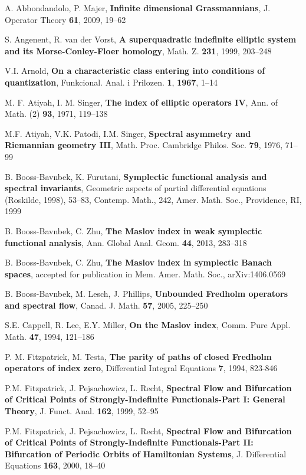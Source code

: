 \documentclass[a4paper,10pt]{article}
\begin{document}
 A. Abbondandolo, P. Majer, \textbf{Infinite dimensional Grassmannians}, J. Operator Theory \textbf{61}, 2009, 19--62

 S. Angenent, R. van der Vorst, \textbf{A superquadratic indefinite elliptic system and its Morse-Conley-Floer homology}, Math. Z. \textbf{231}, 1999, 203--248

 V.I. Arnold, \textbf{On a characteristic class entering into conditions of quantization},
 Funkcional. Anal. i Prilozen. \textbf{1}, \textbf{1967}, 1--14

 M. F. Atiyah, I. M.  Singer, \textbf{The index of elliptic operators IV}, Ann. of Math. (2) \textbf{93}, 1971, 119--138

 M.F. Atiyah, V.K.  Patodi, I.M.  Singer, \textbf{Spectral asymmetry and Riemannian geometry III},
 Math. Proc. Cambridge Philos. Soc.  \textbf{79}, 1976, 71--99

 B. Booss-Bavnbek, K. Furutani, \textbf{Symplectic functional analysis and spectral invariants}, Geometric aspects of partial differential equations (Roskilde, 1998), 53--83, Contemp. Math., 242, Amer. Math. Soc., Providence, RI,  1999

 B. Booss-Bavnbek, C. Zhu, \textbf{The Maslov index in weak symplectic functional analysis},  Ann. Global Anal. Geom. \textbf{44}, 2013, 283--318

 B. Booss-Bavnbek, C. Zhu, \textbf{The Maslov index in symplectic Banach spaces}, accepted for publication in Mem. Amer. Math. Soc., arXiv:1406.0569

 B. Booss-Bavnbek, M. Lesch, J. Phillips, \textbf{Unbounded Fredholm operators and spectral flow}, Canad. J. Math. \textbf{57}, 2005, 225--250

 S.E. Cappell, R. Lee, E.Y. Miller, \textbf{On the Maslov index}, Comm. Pure Appl. Math. \textbf{47},  1994, 121--186

 P. M. Fitzpatrick, M. Testa, \textbf{The parity of paths of closed Fredholm operators of index zero}, Differential Integral Equations  \textbf{7}, 1994, 823-846

  P.M. Fitzpatrick, J. Pejsachowicz, L. Recht, \textbf{Spectral Flow and Bifurcation of Critical Points of Strongly-Indefinite Functionals-Part I: General Theory}, J. Funct. Anal. \textbf{162}, 1999, 52--95

 P.M. Fitzpatrick, J. Pejsachowicz, L. Recht, 
\textbf{Spectral Flow and Bifurcation of Critical Points of Strongly-Indefinite Functionals-Part II: Bifurcation of Periodic Orbits of Hamiltonian Systems}, J. Differential Equations \textbf{163}, 2000, 18--40
\end{document}
